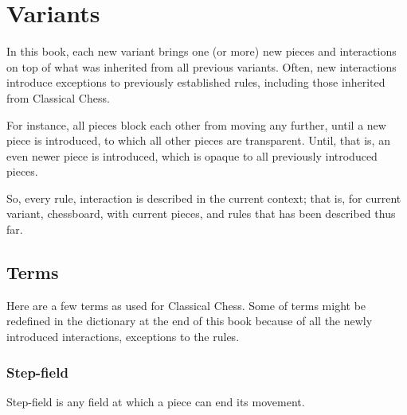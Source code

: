 
\section*{Variants}
\label{sec:Classical Chess/Variants}

In this book, each new variant brings one (or more) new pieces and interactions
on top of what was inherited from all previous variants. Often, new interactions
introduce exceptions to previously established rules, including those inherited
from Classical Chess.

For instance, all pieces block each other from moving any further, until a new
piece is introduced, to which all other pieces are transparent. Until, that is,
an even newer piece is introduced, which is opaque to all previously introduced
pieces.


So, every rule, interaction is described in the current context; that is, for
current variant, chessboard, with current pieces, and rules that has been
described thus far.

\subsection*{Terms}
\label{sec:Classical Chess/Variants/Terms}

Here are a few terms as used for Classical Chess. Some of terms might be redefined
in the dictionary at the end of this book because of all the newly introduced
interactions, exceptions to the rules.

\subsubsection*{Step-field}
\label{sec:Classical Chess/Variants/Terms/Step-field}
Step-field is any field at which a piece can end its movement.

